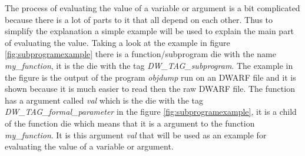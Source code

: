  


The process of evaluating the value of a variable or argument is a bit complicated because there is a lot of parts to it that all depend on each other.
Thus to simplify the explanation a simple example will be used to explain the main part of evaluating the value.
Taking a look at the example in figure \ref{fig:subprogramexample} there is a function/subprogram \gls{die} with the name \emph{my\_function}, it is the \gls{die} with the tag \emph{DW\_TAG\_subprogram}.
The example in the figure is the output of the program \emph{objdump} run on an \gls{DWARF} file and it is shown because it is much easier to read then the raw \gls{DWARF} file.
The function has a argument called \emph{val} which is the \gls{die} with the tag \emph{DW\_TAG\_formal\_parameter} in the figure \ref{fig:subprogramexample}, it is a child of the function \gls{die} which means that it is a argument to the function \emph{my\_function}.
It is this argument \emph{val} that will be used as an example for evaluating the value of a variable or argument.

